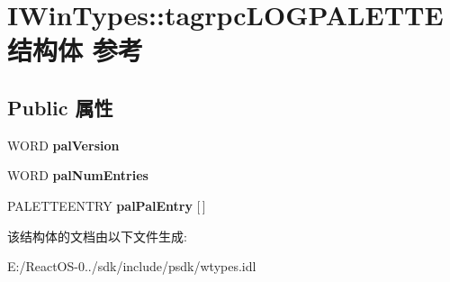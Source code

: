 \hypertarget{struct_i_win_types_1_1tagrpc_l_o_g_p_a_l_e_t_t_e}{}\section{I\+Win\+Types\+:\+:tagrpc\+L\+O\+G\+P\+A\+L\+E\+T\+T\+E结构体 参考}
\label{struct_i_win_types_1_1tagrpc_l_o_g_p_a_l_e_t_t_e}
\subsection*{Public 属性}
\begin{DoxyCompactItemize}
\item 
\mbox{\label{struct_i_win_types_1_1tagrpc_l_o_g_p_a_l_e_t_t_e_ab7fe13d8daaad232b87852a5c59b7448}} 
W\+O\+RD {\bfseries pal\+Version}
\item 
\mbox{\label{struct_i_win_types_1_1tagrpc_l_o_g_p_a_l_e_t_t_e_a732c3cabeb0208a121ef82ea290b2e7e}} 
W\+O\+RD {\bfseries pal\+Num\+Entries}
\item 
\mbox{\label{struct_i_win_types_1_1tagrpc_l_o_g_p_a_l_e_t_t_e_a85ed45d69259c9fa4411800c3ca3b6fe}} 
P\+A\+L\+E\+T\+T\+E\+E\+N\+T\+RY {\bfseries pal\+Pal\+Entry} \mbox{[}$\,$\mbox{]}
\end{DoxyCompactItemize}


该结构体的文档由以下文件生成\+:\begin{DoxyCompactItemize}
\item 
E\+:/\+React\+O\+S-\/0../sdk/include/psdk/wtypes.\+idl\end{DoxyCompactItemize}
